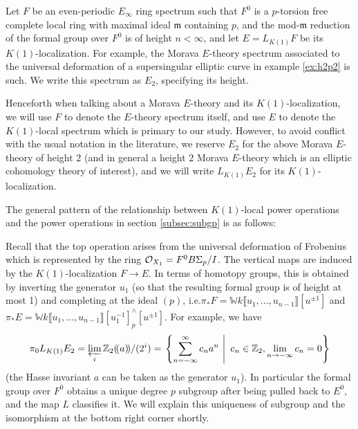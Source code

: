\documentclass{gtpart}
\theoremstyle{definition}
\theoremstyle{remark}
\newcommand{\mb}[1]{\mathbb{#1}}
\newcommand{\mf}[1]{\mathfrak{#1}}
\newcommand{\CO}{{\cal O}}
\begin{document}
Let $F$ be an even-periodic $E_\infty$ ring spectrum such that $F^0$ is a 
$p$-torsion free complete local ring with maximal ideal $\mf m$ containing 
$p$, and the mod-$\mf m$ reduction of the formal group over $F^0$ is of height 
$n < \infty$, and let $E = L_{K(1)} F$ be its $K(1)$-localization.  For 
example, the Morava $E$-theory spectrum associated to the universal 
deformation of a supersingular elliptic curve in example \ref{ex:h2p2} is 
such.  We write this spectrum as $E_2$, specifying its height.  

Henceforth when talking about a Morava $E$-theory and its $K(1)$-localization, 
we will use $F$ to denote the $E$-theory spectrum itself, and use $E$ to 
denote the $K(1)$-local spectrum which is primary to our study.  However, to 
avoid conflict with the usual notation in the literature, we reserve $E_2$ for 
the above Morava $E$-theory of height 2 (and in general a height 2 Morava 
$E$-theory which is an elliptic cohomology theory of interest), and we will 
write $L_{K(1)} E_2$ for its $K(1)$-localization.  

The general pattern of the relationship between $K(1)$-local power operations 
and the power operations in section \ref{subsec:subgp} is as follows: 
\begin{center}
\end{center}
Recall that the top operation arises from the universal deformation of 
Frobenius which is represented by the ring $\CO_{X_1} = F^0 B\Sigma_p/I$.  The 
vertical maps are induced by the $K(1)$-localization $F \to E$.  In terms of 
homotopy groups, this is obtained by inverting the generator $u_1$ (so that 
the resulting formal group is of height at most 1) and completing at the ideal 
$(p)$, i.e.\thinspace$\pi_* F = {\mb W}k \llbracket u_1,...,u_{n-1} \rrbracket 
[u^{\pm1}]$ and $\pi_* E = 
{\mb W}k \llbracket u_1,...,u_{n-1} \rrbracket [u_1^{-1}]_p^\wedge 
[u^{\pm1}]$.  For example, we have 
\[
 \pi_0 L_{K(1)} E_2 = \varprojlim_i {\mb Z_2} (\!(a)\!) /(2^i) = 
 \left.\left\{\sum_{n = -\infty}^{\infty} c_n a^n~\right|~c_n \in {\mb Z}_2, 
 \lim_{n \to -\infty} c_n = 0\right\} 
\]
(the Hasse invariant $a$ can be taken as the generator $u_1$).  In particular 
the formal group over $F^0$ obtains a unique degree $p$ subgroup after being 
pulled back to $E^0$, and the map $L$ classifies it.  We will explain this 
uniqueness of subgroup and the isomorphism at the bottom right corner shortly.  
\end{document}
